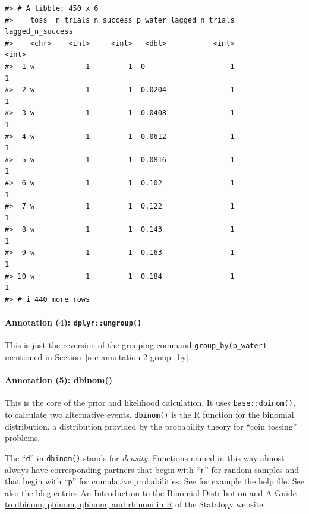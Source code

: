 \documentclass[
  letterpaper,
  DIV=11,
  numbers=noendperiod]{scrreprt}
\let\oldparagraph\paragraph
\renewcommand{\paragraph}[1]{\oldparagraph{#1}\mbox{}}
\begin{document}
\begin{verbatim}
#> # A tibble: 450 x 6
#>    toss  n_trials n_success p_water lagged_n_trials lagged_n_success
#>    <chr>    <int>     <int>   <dbl>           <int>            <int>
#>  1 w            1         1  0                    1                1
#>  2 w            1         1  0.0204               1                1
#>  3 w            1         1  0.0408               1                1
#>  4 w            1         1  0.0612               1                1
#>  5 w            1         1  0.0816               1                1
#>  6 w            1         1  0.102                1                1
#>  7 w            1         1  0.122                1                1
#>  8 w            1         1  0.143                1                1
#>  9 w            1         1  0.163                1                1
#> 10 w            1         1  0.184                1                1
#> # i 440 more rows
\end{verbatim}

\hypertarget{sec-annotation-4-ungroup}{%
\paragraph{\texorpdfstring{Annotation (4):
\texttt{dplyr::ungroup()}}{Annotation (4): dplyr::ungroup()}}\label{sec-annotation-4-ungroup}}

This is just the reversion of the grouping command
\texttt{group\_by(p\_water)} mentioned in
Section~\ref{sec-annotation-2-group_by}.

\hypertarget{sec-annotation-5-dbinom}{%
\paragraph{Annotation (5): dbinom()}\label{sec-annotation-5-dbinom}}

This is the core of the prior and likelihood calculation. It uses
\texttt{base::dbinom()}, to calculate two alternative events.
\texttt{dbinom()} is the R function for the binomial distribution, a
distribution provided by the probability theory for ``coin tossing''
problems.

The ``\texttt{d}'' in \texttt{dbinom()} stands for \emph{density}.
Functions named in this way almost always have corresponding partners
that begin with ``\texttt{r}'' for random samples and that begin with
``\texttt{p}'' for cumulative probabilities. See for example the
\href{https://stat.ethz.ch/R-manual/R-devel/library/stats/html/Binomial.html}{help
file}. See also the blog entries
\href{https://www.statology.org/binomial-distribution/}{An Introduction
to the Binomial Distribution} and
\href{https://www.statology.org/dbinom-pbinom-qbinom-rbinom-in-r/}{A
Guide to dbinom, pbinom, qbinom, and rbinom in R} of the Statalogy
website.
\end{document}
